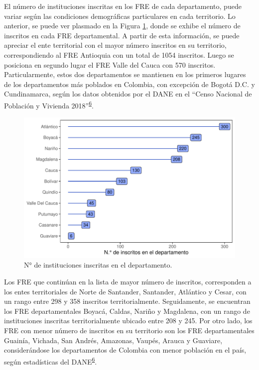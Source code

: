 \documentclass[
  oneside]{book}
\begin{document}
El número de instituciones inscritas en los FRE de cada departamento, puede variar según las condiciones demográficas particulares en cada territorio. Lo anterior, se puede ver plasmado en la Figura \ref{fig:institucionesInscritas}, donde se exhibe el número de inscritos en cada FRE departamental. A partir de esta información, se puede apreciar el ente territorial con el mayor número inscritos en su territorio, correspondiendo al FRE Antioquia con un total de 1054 inscritos. Luego se posiciona en segundo lugar el FRE Valle del Cauca con 570 inscritos. Particularmente, estos dos departamentos se mantienen en los primeros lugares de los departamentos más poblados en Colombia, con excepción de Bogotá D.C. y Cundinamarca, según los datos obtenidos por el DANE en el ``Censo Nacional de Población y Vivienda 2018''\textsuperscript{\protect\hyperlink{ref-DANE2021}{6}}.

\begin{figure}[t]

{\centering \includegraphics[width=0.9\linewidth]{InformeFinal_files/figure-latex/institucionesInscritas-1} 

}

\caption{N° de instituciones inscritas en el departamento.}\label{fig:institucionesInscritas}
\end{figure}

Los FRE que continúan en la lista de mayor número de inscritos, corresponden a los entes territoriales de Norte de Santander, Santander, Atlántico y Cesar, con un rango entre 298 y 358 inscritos territorialmente. Seguidamente, se encuentran los FRE departamentales Boyacá, Caldas, Nariño y Magdalena, con un rango de instituciones inscritas territorialmente ubicado entre 208 y 245. Por otro lado, los FRE con menor número de inscritos en su territorio son los FRE departamentales Guainía, Vichada, San Andrés, Amazonas, Vaupés, Arauca y Guaviare, considerándose los departamentos de Colombia con menor población en el país, según estadísticas del DANE\textsuperscript{\protect\hyperlink{ref-DANE2021}{6}}.
\end{document}
